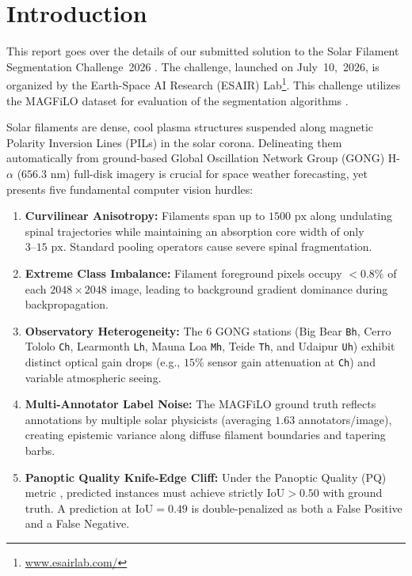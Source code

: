 \documentclass[sigconf]{acmart}
\begin{document}
\maketitle

\section{Introduction}
    This report goes over the details of our submitted solution to the Solar Filament Segmentation Challenge~2026 \cite{filament-segmentation-2026}. The challenge, launched on July~10,~2026, is organized by the Earth-Space AI Research (ESAIR) Lab\footnote{\href{https://www.esairlab.com/home}{www.esairlab.com/}}. This challenge utilizes the MAGFiLO dataset for evaluation of the segmentation algorithms \cite{ahmadzadeh2024dataset}.

    Solar filaments are dense, cool plasma structures suspended along magnetic Polarity Inversion Lines (PILs) in the solar corona. Delineating them automatically from ground-based Global Oscillation Network Group (GONG) H-$\alpha$ ($656.3\text{ nm}$) full-disk imagery is crucial for space weather forecasting, yet presents five fundamental computer vision hurdles:
    \begin{enumerate}
        \item \textbf{Curvilinear Anisotropy:} Filaments span up to $1500\text{ px}$ along undulating spinal trajectories while maintaining an absorption core width of only $3\text{--}15\text{ px}$. Standard pooling operators cause severe spinal fragmentation.
        \item \textbf{Extreme Class Imbalance:} Filament foreground pixels occupy $< 0.8\%$ of each $2048 \times 2048$ image, leading to background gradient dominance during backpropagation.
        \item \textbf{Observatory Heterogeneity:} The 6 GONG stations (Big Bear \texttt{Bh}, Cerro Tololo \texttt{Ch}, Learmonth \texttt{Lh}, Mauna Loa \texttt{Mh}, Teide \texttt{Th}, and Udaipur \texttt{Uh}) exhibit distinct optical gain drops (e.g., $15\%$ sensor gain attenuation at \texttt{Ch}) and variable atmospheric seeing.
        \item \textbf{Multi-Annotator Label Noise:} The MAGFiLO ground truth reflects annotations by multiple solar physicists (averaging $1.63$ annotators/image), creating epistemic variance along diffuse filament boundaries and tapering barbs.
        \item \textbf{Panoptic Quality Knife-Edge Cliff:} Under the Panoptic Quality (PQ) metric \cite{kirillov2019panoptic}, predicted instances must achieve strictly $\text{IoU} > 0.50$ with ground truth. A prediction at $\text{IoU} = 0.49$ is double-penalized as both a False Positive and a False Negative.
    \end{enumerate}
\end{document}
